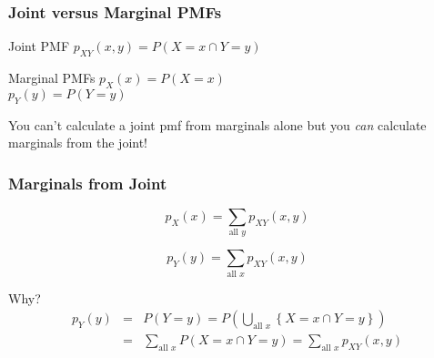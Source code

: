 %
%
%
%
\begin{frame}
\frametitle{Joint versus Marginal PMFs}

\begin{block}{Joint PMF}
 $p_{XY}(x,y) = P(X=x \cap Y=y)$
\end{block}



\begin{block}{Marginal PMFs}
$p_X(x) = P(X=x)$\\ $p_Y(y) = P(Y=y)$
\end{block}



\vspace{1em}

\alert{You can't calculate a joint pmf from marginals alone but you \emph{can} calculate marginals from the joint!}

\end{frame}
\begin{frame}
\frametitle{Marginals from Joint}

	$$\boxed{p_X(x) = \sum_{\mbox{all } y} p_{XY}(x,y)}$$
	
	$$\boxed{p_Y(y) = \sum_{\mbox{all } x} p_{XY}(x,y)}$$


\begin{block}{Why?}
	\begin{eqnarray*}
	p_Y(y) &=& P(Y=y) = P\left( \bigcup_{\mbox{all } x}\left\{ X=x \cap Y=y \right\}  \right)\\
		&=& \sum_{\mbox{all } x} P(X=x \cap Y=y) = \sum_{\mbox{all } x} p_{XY}(x,y)
	\end{eqnarray*}
\end{block}
\end{frame}
